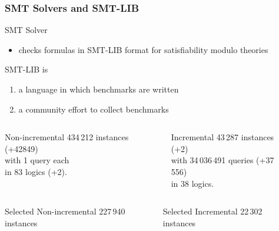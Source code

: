 \documentclass[table]{beamer}
\def\emph#1{\textcolor{MYblue}{#1}}
\begin{document}
\begin{frame}
  \frametitle{SMT Solvers and SMT-LIB}
  SMT Solver
  \begin{itemize}
  \item checks formulas
    in \emph{SMT-LIB} format
    for \emph{satisfiability modulo theories}
  \end{itemize}
  \bigskip

  SMT-LIB is
  \begin{enumerate}
  \item a \emph{language} in which benchmarks are written
  \item a community effort to \emph{collect benchmarks}
  \end{enumerate}
  \medskip

  \begin{columns}
    \begin{column}{0.4\textwidth}
      \begin{block}{Non-incremental}
        434\,212 instances {\small (+42849)}\\ %
        with 1 query each \\
        in 83 logics {\small (+2)}.
      \end{block}
    \end{column}
    \begin{column}{0.4\textwidth}
      \begin{block}{Incremental}
        43\,287 instances {\small (+2)}\\
        with 34\,036\,491 queries {\small (+37\,556)} \\ %
        in 38 logics. %
      \end{block}
    \end{column}
    \begin{column}{0.08\textwidth}
    \end{column}
  \end{columns}
  \pause
    \begin{columns}
    \begin{column}{0.4\textwidth}
      \begin{block}{Selected Non-incremental}
        227\,940 instances
      \end{block}
    \end{column}
    \begin{column}{0.4\textwidth}
      \begin{block}{Selected Incremental}
        22\,302 instances
      \end{block}
    \end{column}
    \begin{column}{0.08\textwidth}
    \end{column}
  \end{columns}

\end{frame}
\end{document}
